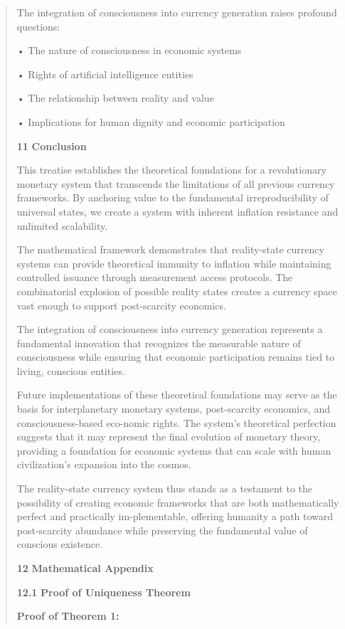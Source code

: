 \documentclass[
]{article}
\begin{document}
\begin{quote}
The integration of consciousness into currency generation raises
profound questions:

• The nature of consciousness in economic systems

• Rights of artificial intelligence entities

• The relationship between reality and value

• Implications for human dignity and economic participation

\textbf{11} \textbf{Conclusion}

This treatise establishes the theoretical foundations for a
revolutionary monetary system that transcends the limitations of all
previous currency frameworks. By anchoring value to the fundamental
irreproducibility of universal states, we create a system with inherent
inflation resistance and unlimited scalability.

The mathematical framework demonstrates that reality-state currency
systems can provide theoretical immunity to inflation while maintaining
controlled issuance through measurement access protocols. The
combinatorial explosion of possible reality states creates a currency
space vast enough to support post-scarcity economics.

The integration of consciousness into currency generation represents a
fundamental innovation that recognizes the measurable nature of
consciousness while ensuring that economic participation remains tied to
living, conscious entities.

Future implementations of these theoretical foundations may serve as the
basis for interplanetary monetary systems, post-scarcity economics, and
consciousness-based eco-nomic rights. The system's theoretical
perfection suggests that it may represent the final evolution of
monetary theory, providing a foundation for economic systems that can
scale with human civilization's expansion into the cosmos.

The reality-state currency system thus stands as a testament to the
possibility of creating economic frameworks that are both mathematically
perfect and practically im-plementable, offering humanity a path toward
post-scarcity abundance while preserving the fundamental value of
conscious existence.

\textbf{12} \textbf{Mathematical Appendix}

\textbf{12.1} \textbf{Proof of Uniqueness Theorem}

\textbf{Proof of Theorem 1:}
\end{quote}
\end{document}
